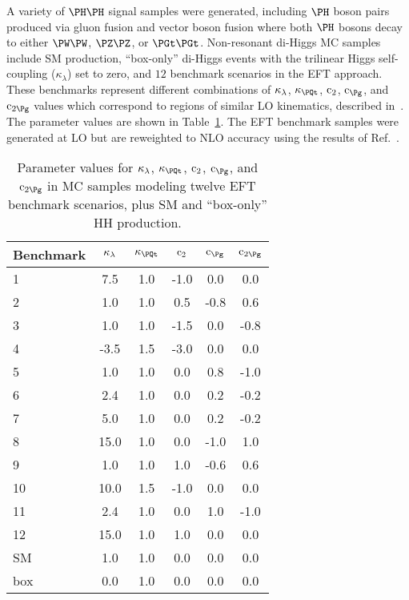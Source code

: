 A variety of $\PHiggs\PHiggs$ signal samples were generated, including $\PHiggs$ boson pairs produced via gluon
fusion and vector boson fusion where both $\PHiggs$ bosons decay to either $\PW\PW$, $\PZ\PZ$, or $\PGt\PGt$.
Non-resonant di-Higgs MC samples include SM production, ``box-only'' di-Higgs events with
the trilinear Higgs self-coupling ($\kappa_{\lambda}$) set to zero, and $12$ benchmark scenarios
in the EFT approach.  These benchmarks represent different combinations of
$\kappa_{\lambda}$, $\kappat$, $\text{c}_{2}$, $\cg$, and $\cgg$ values which correspond
to regions of similar LO kinematics, described in~\cite{Carvalho:2015ttv}.  The parameter
values are shown in Table~\ref{tab:HH_benchmarks}.  The EFT benchmark samples were
generated at LO but are reweighted to NLO accuracy using the results of Ref.~\cite{Buchalla:2018yce}.

\begin{table}[!h]
\begin{center}
\begin{tabular}{|l|c|c|c|c|c|} \hline
Benchmark & $\kappa_{\lambda}$  & $\kappat$ & $\text{c}_{2}$ & $\cg$ &  $\cgg$ \\
\hline
1         & 7.5        & 1.0       & -1.0    & 0.0   & 0.0  \\
2         & 1.0        & 1.0       &  0.5    & -0.8  & 0.6  \\
3         & 1.0        & 1.0       & -1.5    & 0.0   & -0.8 \\
4         & -3.5       & 1.5       & -3.0    & 0.0   & 0.0  \\
5         & 1.0        & 1.0       & 0.0     & 0.8   & -1.0 \\
6         & 2.4        & 1.0       & 0.0     & 0.2   & -0.2 \\
7         & 5.0        & 1.0       & 0.0     & 0.2   & -0.2 \\
8         & 15.0       & 1.0       & 0.0     & -1.0  & 1.0  \\
9         & 1.0        & 1.0       & 1.0     & -0.6  & 0.6  \\
10        & 10.0       & 1.5       & -1.0    & 0.0   & 0.0  \\
11        & 2.4        & 1.0       & 0.0     & 1.0   & -1.0 \\
12        & 15.0       & 1.0       & 1.0     & 0.0   & 0.0  \\
\hline
SM        & 1.0        & 1.0       & 0.0     & 0.0   & 0.0  \\
box       & 0.0        & 1.0       & 0.0     & 0.0   & 0.0  \\
\hline
\end{tabular}
\end{center}
\caption{
  Parameter values for $\kappa_{\lambda}$, $\kappat$, $\text{c}_{2}$, $\cg$, and
  $\cgg$ in MC samples modeling twelve EFT benchmark scenarios, plus SM
  and ``box-only'' HH production.
}
\label{tab:HH_benchmarks}
\end{table}


